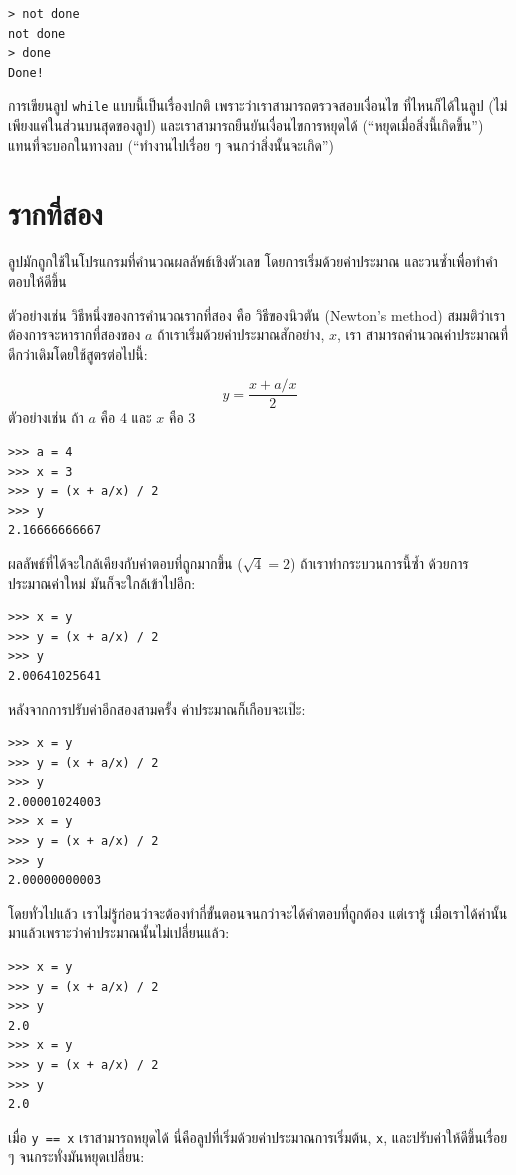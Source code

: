 \begin{verbatim}
> not done
not done
> done
Done!
\end{verbatim}
% 
การเขียนลูป {\tt while} แบบนี้เป็นเรื่องปกติ เพราะว่าเราสามารถตรวจสอบเงื่อนไข
ที่ไหนก็ได้ในลูป (ไม่เพียงแค่ในส่วนบนสุดของลูป) และเราสามารถยืนยันเงื่อนไขการหยุดได้
(``หยุดเมื่อสิ่งนี้เกิดขึ้น'') แทนที่จะบอกในทางลบ (``ทำงานไปเรื่อย ๆ จนกว่าสิ่งนั้นจะเกิด'')


\section{รากที่สอง} %
\label{squareroot}

ลูปมักถูกใช้ในโปรแกรมที่คำนวณผลลัพธ์เชิงตัวเลข โดยการเริ่มด้วยค่าประมาณ
และวนซ้ำเพื่อทำคำตอบให้ดีขึ้น

ตัวอย่างเช่น วิธีหนึ่งของการคำนวณรากที่สอง คือ วิธีของนิวตัน (Newton's method)
สมมติว่าเราต้องการจะหารากที่สองของ $a$ ถ้าเราเริ่มด้วยค่าประมาณสักอย่าง, $x$, เรา
สามารถคำนวณค่าประมาณที่ดีกว่าเดิมโดยใช้สูตรต่อไปนี้:

\[ y = \frac{x + a/x}{2} \]
%
ตัวอย่างเช่น ถ้า $a$ คือ 4 และ $x$ คือ 3

\begin{verbatim}
>>> a = 4
>>> x = 3
>>> y = (x + a/x) / 2
>>> y
2.16666666667
\end{verbatim}
%
ผลลัพธ์ที่ได้จะใกล้เคียงกับคำตอบที่ถูกมากขึ้น ($\sqrt{4} = 2$) ถ้าเราทำกระบวนการนี้ซ้ำ
ด้วยการประมาณค่าใหม่ มันก็จะใกล้เข้าไปอีก:

\begin{verbatim}
>>> x = y
>>> y = (x + a/x) / 2
>>> y
2.00641025641
\end{verbatim}
%
หลังจากการปรับค่าอีกสองสามครั้ง ค่าประมาณก็เกือบจะเป๊ะ:

\begin{verbatim}
>>> x = y
>>> y = (x + a/x) / 2
>>> y
2.00001024003
>>> x = y
>>> y = (x + a/x) / 2
>>> y
2.00000000003
\end{verbatim}
%
โดยทั่วไปแล้ว เราไม่รู้ก่อนว่าจะต้องทำกี่ขั้นตอนจนกว่าจะได้คำตอบที่ถูกต้อง แต่เรารู้
เมื่อเราได้ค่านั้นมาแล้วเพราะว่าค่าประมาณนั้นไม่เปลี่ยนแล้ว:

\begin{verbatim}
>>> x = y
>>> y = (x + a/x) / 2
>>> y
2.0
>>> x = y
>>> y = (x + a/x) / 2
>>> y
2.0
\end{verbatim}
%
เมื่อ {\tt y == x} เราสามารถหยุดได้ นี่คือลูปที่เริ่มด้วยค่าประมาณการเริ่มต้น, {\tt x},
และปรับค่าให้ดีขึ้นเรื่อย ๆ จนกระทั่งมันหยุดเปลี่ยน:

